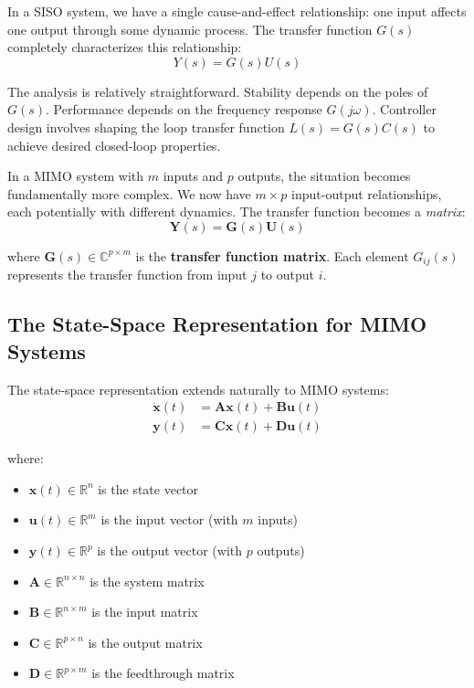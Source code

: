 In a SISO system, we have a single cause-and-effect relationship: one input affects one output through some dynamic process. The transfer function $G(s)$ completely characterizes this relationship:
\begin{equation}
Y(s) = G(s) U(s)
\end{equation}

The analysis is relatively straightforward. Stability depends on the poles of $G(s)$. Performance depends on the frequency response $G(j\omega)$. Controller design involves shaping the loop transfer function $L(s) = G(s)C(s)$ to achieve desired closed-loop properties.

In a MIMO system with $m$ inputs and $p$ outputs, the situation becomes fundamentally more complex. We now have $m \times p$ input-output relationships, each potentially with different dynamics. The transfer function becomes a \textit{matrix}:
\begin{equation}
\mathbf{Y}(s) = \mathbf{G}(s) \mathbf{U}(s)
\end{equation}

where $\mathbf{G}(s) \in \mathbb{C}^{p \times m}$ is the \textbf{transfer function matrix}. Each element $G_{ij}(s)$ represents the transfer function from input $j$ to output $i$.

\subsection{The State-Space Representation for MIMO Systems}

The state-space representation extends naturally to MIMO systems:
\begin{align}
\dot{\mathbf{x}}(t) &= \mathbf{A}\mathbf{x}(t) + \mathbf{B}\mathbf{u}(t) \label{eq:mimo_state}\\
\mathbf{y}(t) &= \mathbf{C}\mathbf{x}(t) + \mathbf{D}\mathbf{u}(t) \label{eq:mimo_output}
\end{align}

where:
\begin{itemize}
\item $\mathbf{x}(t) \in \mathbb{R}^n$ is the state vector
\item $\mathbf{u}(t) \in \mathbb{R}^m$ is the input vector (with $m$ inputs)
\item $\mathbf{y}(t) \in \mathbb{R}^p$ is the output vector (with $p$ outputs)
\item $\mathbf{A} \in \mathbb{R}^{n \times n}$ is the system matrix
\item $\mathbf{B} \in \mathbb{R}^{n \times m}$ is the input matrix
\item $\mathbf{C} \in \mathbb{R}^{p \times n}$ is the output matrix
\item $\mathbf{D} \in \mathbb{R}^{p \times m}$ is the feedthrough matrix
\end{itemize}

